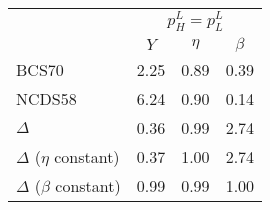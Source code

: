 
\begin{tabular}{lrrr}
\toprule
\multicolumn{1}{c}{} & \multicolumn{3}{c}{$p_{H}^{L}=p_{L}^{L}$} \\
\cmidrule(l{3pt}r{3pt}){2-4}
  & \multicolumn{1}{c}{$Y$} & \multicolumn{1}{c}{$\eta$} & \multicolumn{1}{c}{$\beta$}\\
\midrule
BCS70 & 2.25 & 0.89 & 0.39\\
NCDS58 & 6.24 & 0.90 & 0.14\\
\midrule
$\Delta$ & 0.36 & 0.99 & 2.74\\
\midrule
$\Delta$ ($\eta$ constant) & 0.37 & 1.00 & 2.74\\
$\Delta$ ($\beta$ constant) & 0.99 & 0.99 & 1.00\\
\bottomrule
\end{tabular}
